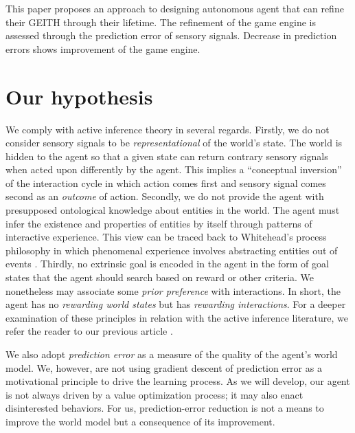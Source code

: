 \documentclass[runningheads]{llncs}
\begin{document}
This paper proposes an approach to designing autonomous agent that can refine their GEITH through their lifetime.
The refinement of the game engine is assessed through 
the prediction error of sensory signals. 
Decrease in prediction errors shows improvement of the game engine. 




\section{Our hypothesis}

We comply with active inference theory in several regards. 
Firstly, we do not consider sensory signals to be \textit{representational} of the world's state. 
The world is hidden to the agent so that a given state can return contrary sensory signals when acted upon differently by the agent.
This implies a ``conceptual inversion'' of the interaction cycle in which action comes first and sensory signal comes second as an  \textit{outcome} of action. 
Secondly, we do not provide the agent with presupposed ontological knowledge about entities in the world. 
The agent must infer the existence and properties of entities by itself through patterns of interactive experience. 
This view can be traced back to Whitehead's process philosophy in which phenomenal experience involves abstracting entities out of events \cite{whitehead1929}. 
Thirdly, no extrinsic goal is encoded in the agent in the form of goal states that the agent should search based on reward or other criteria. 
We nonetheless may associate some \textit{prior preference} with interactions. 
In short, the agent has no \textit{rewarding world states} but has \textit{rewarding interactions}. %
For a deeper examination of these principles in relation with the active inference literature, we refer the reader to our previous article \cite{georgeon_artificial_2024}.

We also adopt \textit{prediction error} as a measure of the quality of the agent's world model. %
We, however, are not using gradient descent of prediction error as a motivational principle to drive the learning process. 
As we will develop, our agent is not always driven by a value optimization process; it may also enact disinterested behaviors.
For us, prediction-error reduction is not a means to improve the world model but a consequence of its improvement.
\end{document}

